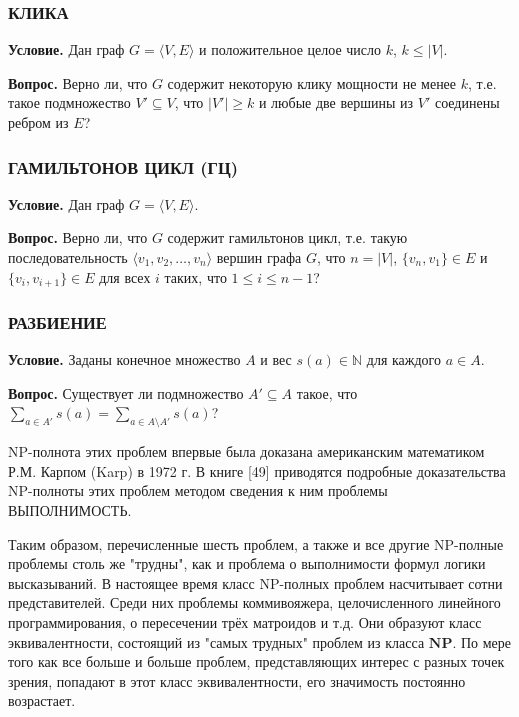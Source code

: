 \documentclass[a4paper,12pt]{article}
\begin{document}
\subsubsection*{КЛИКА}
\textbf{Условие.} Дан граф \(G = \langle V, E \rangle\) и положительное целое число \(k\), \(k \le |V|\).

\textbf{Вопрос.} Верно ли, что \(G\) содержит некоторую клику мощности не менее \(k\), т.е. такое подмножество \(V' \subseteq V\), что \(|V'| \ge k\) и любые две вершины из \(V'\) соединены ребром из \(E\)?

\subsubsection*{ГАМИЛЬТОНОВ ЦИКЛ (ГЦ)}
\textbf{Условие.} Дан граф \(G = \langle V, E \rangle\).

\textbf{Вопрос.} Верно ли, что \(G\) содержит гамильтонов цикл, т.е. такую последовательность \(\langle v_1, v_2, \dots, v_n \rangle\) вершин графа \(G\), что \(n = |V|\), \(\{v_n, v_1\} \in E\) и \(\{v_i, v_{i+1}\} \in E\) для всех \(i\) таких, что \(1 \le i \le n - 1\)?

\subsubsection*{РАЗБИЕНИЕ}
\textbf{Условие.} Заданы конечное множество \(A\) и вес \(s(a) \in \mathbb{N}\) для каждого \(a \in A\).

\textbf{Вопрос.} Существует ли подмножество \(A' \subseteq A\) такое, что \(\sum_{a \in A'} s(a) = \sum_{a \in A \setminus A'} s(a)\)?

\vspace{1em}
NP-полнота этих проблем впервые была доказана американским математиком Р.М. Карпом (Karp) в 1972 г. В книге [49] приводятся подробные доказательства NP-полноты этих проблем методом сведения к ним проблемы ВЫПОЛНИМОСТЬ.

Таким образом, перечисленные шесть проблем, а также и все другие NP-полные проблемы столь же "трудны", как и проблема о выполнимости формул логики высказываний. В настоящее время класс NP-полных проблем насчитывает сотни представителей. Среди них проблемы коммивояжера, целочисленного линейного программирования, о пересечении трёх матроидов и т.д. Они образуют класс эквивалентности, состоящий из "самых трудных" проблем из класса \(\mathbf{NP}\). По мере того как все больше и больше проблем, представляющих интерес с разных точек зрения, попадают в этот класс эквивалентности, его значимость постоянно возрастает.
\end{document}
